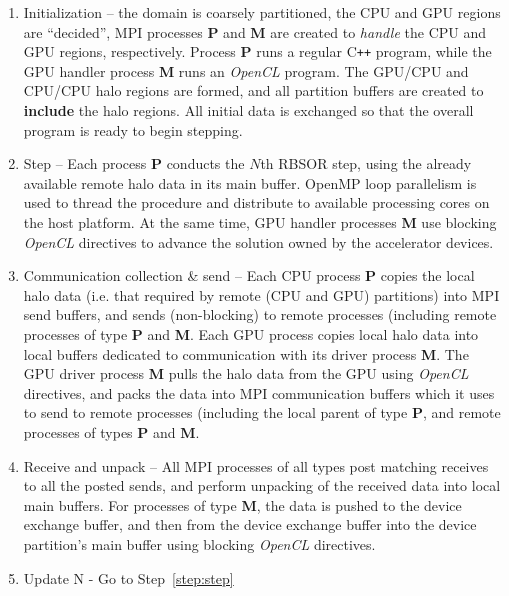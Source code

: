 \documentclass[11pt]{article}
\newcommand{\plusplus}[1]{#1{}\texttt{++}}
\begin{document}
\begin{enumerate}
\item{Initialization} -- the domain is coarsely partitioned, the CPU and GPU regions are ``decided'', MPI processes \textbf{P} and \textbf{M} are created to \textit{handle} the CPU and GPU regions, respectively. Process \textbf{P} runs a regular \plusplus{C} program, while the GPU handler process \textbf{M} runs an \textit{OpenCL} program. The GPU/CPU and CPU/CPU halo regions are formed, and all partition buffers are created to \textbf{include} the halo regions. All initial data is exchanged so that the overall program is ready to begin stepping.
\item{Step}\label{step:step} --  Each process \textbf{P} conducts the $N$th RBSOR step, using the already available remote halo data in its main buffer. OpenMP loop parallelism is used to thread the procedure and distribute to available processing cores on the host platform. At the same time, GPU handler processes \textbf{M} use blocking \textit{OpenCL} directives to advance the solution owned by the accelerator devices.
\item{Communication collection \& send} -- Each CPU process \textbf{P} copies the local halo data (i.e. that required by remote (CPU and GPU) partitions) into MPI send buffers, and sends (non-blocking) to remote processes (including remote processes of type \textbf{P} and \textbf{M}. Each GPU process copies local halo data into local buffers dedicated to communication with its driver process \textbf{M}. The GPU driver process \textbf{M} pulls the halo data from the GPU using \textit{OpenCL} directives, and packs the data into MPI communication buffers which it uses to send to remote processes (including the local parent of type \textbf{P}, and remote processes of types \textbf{P} and \textbf{M}.
\item{Receive and unpack} -- All MPI processes of all types post matching receives to all the posted sends, and perform unpacking of the received data into local main buffers. For processes of type \textbf{M}, the data is pushed to the device exchange buffer, and then from the device exchange buffer into the device partition's main buffer using blocking \textit{OpenCL} directives.
\item{Update N} - Go to Step~\ref{step:step}
\end{enumerate}
\end{document}
